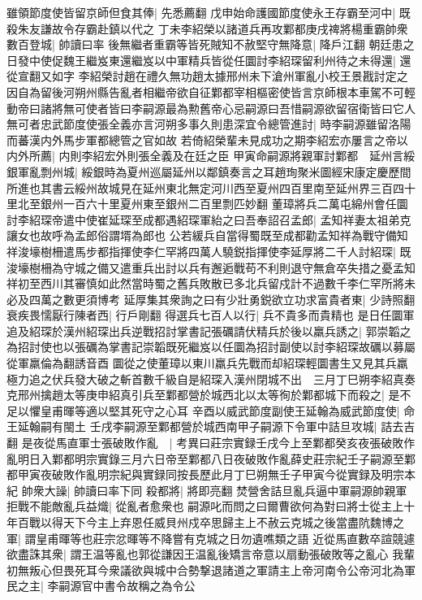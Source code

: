 雖領節度使皆留京師但食其俸|{
	先悉薦翻}
戊申始命護國節度使永王存霸至河中|{
	既殺朱友謙故令存霸赴鎮以代之}
丁未李紹榮以諸道兵再攻鄴都庚戌禆將楊重霸帥衆數百登城|{
	帥讀曰率}
後無繼者重霸等皆死賊知不赦堅守無降意|{
	降戶江翻}
朝廷患之日發中使促魏王繼岌東還繼岌以中軍精兵皆從任圜討李紹琛留利州待之未得還|{
	還從宣翻又如字}
李紹榮討趙在禮久無功趙太據邢州未下滄州軍亂小校王景戡討定之因自為留後河朔州縣告亂者相繼帝欲自征鄴都宰相樞密使皆言京師根本車駕不可輕動帝曰諸將無可使者皆曰李嗣源最為勲舊帝心忌嗣源曰吾惜嗣源欲留宿衛皆曰它人無可者忠武節度使張全義亦言河朔多事久則患深宜令總管進討|{
	時李嗣源雖留洛陽而蕃漢内外馬步軍都總管之官如故}
若倚紹榮輩未見成功之期李紹宏亦屢言之帝以内外所薦|{
	内則李紹宏外則張全義及在廷之臣}
甲寅命嗣源將親軍討鄴都　延州言綏銀軍亂剽州城|{
	綏銀時為夏州巡屬延州以鄰鎮奏言之耳趙珣聚米圖經宋康定慶歷間所進也其書云綏州故城見在延州東北無定河川西至夏州四百里南至延州界三百四十里北至銀州一百六十里夏州東至銀州二百里剽匹妙翻}
董璋將兵二萬屯綿州會任圜討李紹琛帝遣中使崔延琛至成都遇紹琛軍紿之曰吾奉詔召孟郎|{
	孟知祥妻太祖弟克讓女也故呼為孟郎俗謂壻為郎也}
公若緩兵自當得蜀既至成都勸孟知祥為戰守備知祥浚壕樹柵遣馬步都指揮使李仁罕將四萬人驍鋭指揮使李延厚將二千人討紹琛|{
	既浚壕樹柵為守城之備又遣重兵出討以兵有邂逅戰苟不利則退守無倉卒失措之憂孟知祥初至西川其審慎如此然當時蜀之舊兵敗散已多北兵留戍計不過數千李仁罕所將未必及四萬之數更須博考}
延厚集其衆詢之曰有少壯勇鋭欲立功求富貴者東|{
	少詩照翻}
衰疾畏懦厭行陳者西|{
	行戶剛翻}
得選兵七百人以行|{
	兵不貴多而貴精也}
是日任圜軍追及紹琛於漢州紹琛出兵逆戰招討掌書記張礪請伏精兵於後以羸兵誘之|{
	郭崇韜之為招討使也以張礪為掌書記崇韜既死繼岌以任圜為招討副使以討李紹琛故礪以募屬從軍羸倫為翻誘音酉}
圜從之使董璋以東川羸兵先戰而却紹琛輕圜書生又見其兵羸極力追之伏兵發大破之斬首數千級自是紹琛入漢州閉城不出　三月丁巳朔李紹真奏克邢州擒趙太等庚申紹真引兵至鄴都營於城西北以太等徇於鄴都城下而殺之|{
	是不足以懼皇甫暉等適以堅其死守之心耳}
辛酉以威武節度副使王延翰為威武節度使|{
	命王延翰嗣有閩土}
壬戌李嗣源至鄴都營於城西南甲子嗣源下令軍中詰旦攻城|{
	詰去吉翻}
是夜從馬直軍士張破敗作亂　|{
	考異曰莊宗實録壬戌今上至鄴都癸亥夜張破敗作亂明日入鄴都明宗實錄三月六日帝至鄴都八日夜破敗作亂薛史莊宗紀壬子嗣源至鄴都甲寅夜破敗作亂明宗紀與實録同按長歷此月丁巳朔無壬子甲寅今從實録及明宗本紀}
帥衆大譟|{
	帥讀曰率下同}
殺都將|{
	將即亮翻}
焚營舍詰旦亂兵逼中軍嗣源帥親軍拒戰不能敵亂兵益熾|{
	從亂者愈衆也}
嗣源叱而問之曰爾曹欲何為對曰將士從主上十年百戰以得天下今主上弃恩任威貝州戍卒思歸主上不赦云克城之後當盡阬魏博之軍|{
	謂皇甫暉等也莊宗忿暉等不降嘗有克城之日勿遺噍類之語}
近從馬直數卒諠競遽欲盡誅其衆|{
	謂王温等亂也郭從謙因王温亂後矯言帝意以扇動張破敗等之亂心}
我輩初無叛心但畏死耳今衆議欲與城中合勢撃退諸道之軍請主上帝河南令公帝河北為軍民之主|{
	李嗣源官中書令故稱之為令公}
